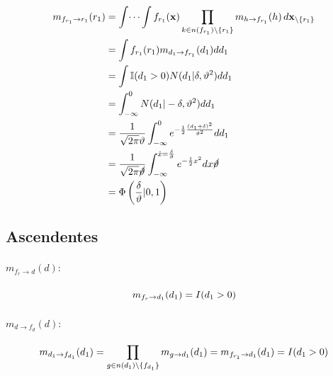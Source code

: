 \documentclass[11pt,twoside, spanish]{report} %
\begin{document}
\begin{equation}
	\begin{split}
		m_{f_{r_1} \rightarrow r_1}(r_1) & = \int \dots \int f_{r_1}(\textbf{x}) \prod_{k\in n(f_{r_1})\backslash\{r_1\}} m_{h \rightarrow f_{r_1}}(h) \, d\textbf{x}_{\backslash \{r_1\}} \\
		& = \int f_{r_1}(r_1) m_{d_1 \rightarrow f_{r_1}}(d_1)  dd_1 \\
		& = \int \mathbb{I}(d_1 > 0) N(d_1 \vert \delta, \vartheta^2)  dd_1 \\
		& = \int_{-\infty}^0  N(d_1 \vert -\delta, \vartheta^2)  dd_1 \\
		&=\frac{1}{\sqrt{2\pi}\vartheta} \int_{-\infty}^0e^{-\frac{1}{2}\frac{(d_1+\delta)^2}{ \vartheta^2}}dd_1\\
		&=\frac{1}{\sqrt{2\pi}\cancel{\vartheta}} \int_{-\infty}^{\hat{x}=\frac{\delta}{\vartheta}}e^{-\frac{1}{2}x^2}dx\cancel{\vartheta}\\
		& = \Phi\left(\frac{\delta}{\vartheta}\vert0,1\right)
	\end{split}
\end{equation}







\subsection{\textbf{Ascendentes}}
\label{appendix:mensajesB}
\paragraph{$m_{f_{r}\rightarrow d}(d):$}

\begin{equation}
	\centering
	m_{f_{r}\rightarrow d_1}(d_1) = I(d_1>0)
\end{equation}

\paragraph{$m_{d\rightarrow f_{d}}(d):$}

\begin{equation}
	\centering
	m_{d_1\rightarrow f_{d_1}}(d_1) = \prod_{g\in n(d_1)\backslash\{f_{d_1}\}} m_{g\rightarrow d_1}(d_1)
	= m_{f_{r_1}\rightarrow d_1}(d_1)
	=  I(d_1>0)
\end{equation}
\end{document}
